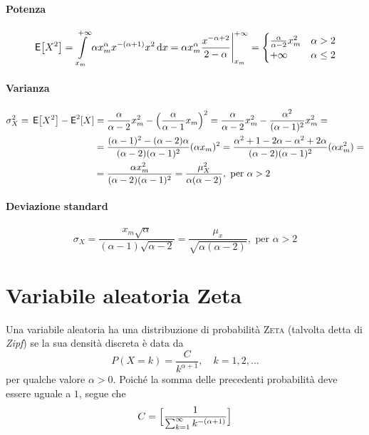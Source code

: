\paragraph{Potenza}
\begin{equation}
	\,{\operatorname{\mathsf{E}}}\!\left[{X^2}\right] = \int\limits_{x_m}^{+\infty}{\alpha x_m^\alpha x^{-(\alpha +1)} x^2}{\,\mathop{}\!\mathrm{d}{x}} =
	\alpha x_m^\alpha \frac{x^{-\alpha +2}}{2-\alpha} \Bigg|_{x_m}^{+\infty} =
	\begin{cases}
		\frac{\alpha}{\alpha -2}x_m^2 & \alpha > 2 \\
		+\infty & \alpha \leq 2
	\end{cases}
\end{equation}

\paragraph{Varianza}
\begin{equation}\begin{split}
	\sigma_X^2 = \,{\operatorname{\mathsf{E}}}\!\left[{X^2}\right] - \operatorname{\mathsf{E}}^2[X] &=
		\frac{\alpha}{\alpha -2} x_m^2 - \Bigl(\frac{\alpha}{\alpha -1} x_m\Bigr)^2 =
		\frac{\alpha}{\alpha -2} x_m^2 - \frac{\alpha^2}{(\alpha - 1)^2} x_m^2 = \\
	&= \frac{(\alpha -1)^2 - (\alpha -2)\alpha}{(\alpha -2)(\alpha -1)^2}(\alpha x_m)^2 =
		\frac{\alpha^2 +1 -2\alpha -\alpha^2 +2\alpha}{(\alpha -2)(\alpha -1)^2} (\alpha x_m^2) = \\
	& = \frac{\alpha x_m^2}{(\alpha -2)(\alpha -1)^2} = \frac{\mu_X^2}{\alpha (\alpha -2)}, \text{ per } \alpha > 2
\end{split}\end{equation}

\paragraph{Deviazione standard}
\begin{equation}
	\sigma_X = \frac{x_m \sqrt{\alpha}}{(\alpha -1) \sqrt{\alpha -2}} = \frac{\mu_x}{\sqrt{\alpha (\alpha -2)}}, \text{ per } \alpha > 2
\end{equation}

\section{Variabile aleatoria Zeta}
Una variabile aleatoria ha una distribuzione di probabilità \textsc{Zeta}
(talvolta detta di \emph{Zipf}) se la sua densità discreta è data da
\begin{equation}
	P(X = k) = \frac{C}{k^{\alpha+1}},
	\quad k=1,2,\dots
\end{equation}
per qualche valore \(\alpha > 0\). Poiché la somma delle precedenti probabilità
deve essere uguale a \(1\), segue che
\begin{equation}
	C = \Bigl[ \frac{1}{\sum_{k=1}^{\infty} k^{-(\alpha+1)}} \Bigr]
\end{equation}

